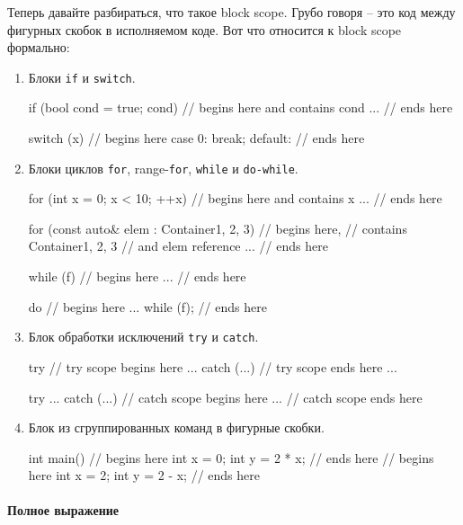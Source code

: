 \documentclass{article}
\begin{document}
Теперь давайте разбираться, что такое block scope.
Грубо говоря -- это код между фигурных скобок в исполняемом коде.
Вот что относится к block scope формально:
\begin{enumerate}
\item Блоки \verb"if" и \verb"switch".
\begin{cppcode}[numbers = none]
if (bool cond = true; cond) { // begins here and contains cond
  ...
} // ends here

switch (x) { // begins here
  case 0:
  break;
  default:
}// ends here
\end{cppcode}

\item Блоки циклов \verb"for", range-\verb"for", \verb"while" и \verb"do-while".
\begin{cppcode}[numbers = none]
for (int x = 0; x < 10; ++x) { // begins here and contains x
  ...
} // ends here

for (const auto& elem : Container{1, 2, 3}) { // begins here,
                                              // contains Container{1, 2, 3}
                                              // and elem reference
  ...
} // ends here

while (f) { // begins here
  ...
} // ends here

do { // begins here
  ...
} while (f); // ends here
\end{cppcode}

\item Блок обработки исключений \verb"try" и \verb"catch".
\begin{cppcode}[numbers = none]
try { // try scope begins here
  ...
} catch (...) { // try scope ends here
  ...
}

try {
  ...
} catch (...) { // catch scope begins here
  ...
} // catch scope ends here
\end{cppcode}

\item Блок из сгруппированных команд в фигурные скобки.
\begin{cppcode}[numbers = none]
int main() {
  { // begins here
    int x = 0;
    int y = 2 * x;
  } // ends here
  { // begins here
    int x = 2;
    int y = 2 - x;
  } // ends here
}
\end{cppcode}
\end{enumerate}

\paragraph{Полное выражение}
\end{document}
